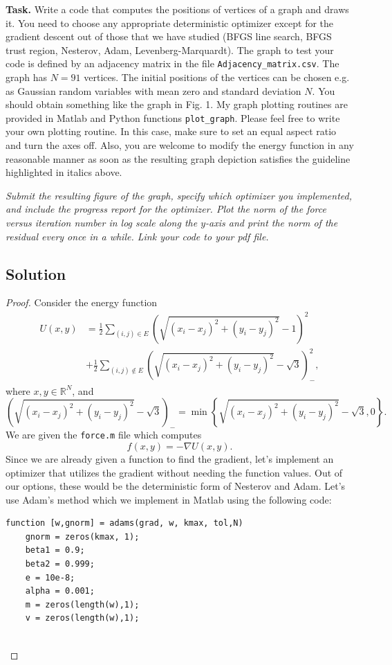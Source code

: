 \documentclass[12pt]{report}
\newenvironment{problem}{}{\newpage}
\begin{document}
\begin{problem}
\textbf{Task.} Write a code that computes the positions of vertices of a graph and draws it. You need to choose any appropriate deterministic optimizer except for the gradient descent out of those that we have studied (BFGS line search, BFGS trust region, Nesterov, Adam, Levenberg-Marquardt). The graph to test your code is defined by an adjacency matrix in the file \verb+Adjacency_matrix.csv+.  The graph has $N = 91$ vertices. The initial positions of the vertices can be chosen e.g. as Gaussian random variables with mean zero and standard deviation $N$. You should obtain something like the graph in Fig. 1. My graph plotting routines are provided in Matlab and Python functions \verb+plot_graph+. Please feel free to write your own plotting routine. In this case, make sure to set an equal aspect ratio and turn the axes off. Also, you are welcome to modify the energy function in any reasonable manner as soon as the resulting graph depiction satisfies the guideline highlighted in italics above.

\textit{Submit the resulting figure of the graph, specify which optimizer you implemented, and include the progress report for the optimizer. Plot the norm of the force versus iteration number in log scale along the $y$-axis and print the norm of the residual every once in a while. Link your code to your pdf file.}



\subsection*{Solution}
\begin{proof}
Consider the energy function 
\begin{align*}
    U(x,y) &= \frac{1}{2} \sum_{(i,j) \in E} \left( \sqrt{(x_i - x_j)^2 + (y_i - y_j)^2} - 1 \right)^2\\
    &+ \frac{1}{2} \sum_{(i,j) \notin E} \left( \sqrt{(x_i - x_j)^2 + (y_i - y_j)^2} - \sqrt{3} \right)^2_{-}, \nonumber
\end{align*}
where $x, y \in \mathbb{R}^N$, and
\begin{equation*}
    \left( \sqrt{(x_i - x_j)^2 + (y_i - y_j)^2} - \sqrt{3} \right)_{-} = \min \left\{ \sqrt{(x_i - x_j)^2 + (y_i - y_j)^2} - \sqrt{3}, 0 \right\}.
\end{equation*}
We are given the \verb+force.m+ file which computes
\begin{equation*}
    f(x,y) = - \nabla U(x,y).
\end{equation*}
Since we are already given a function to find the gradient, let's implement an optimizer that utilizes the gradient without needing the function values. Out of our options, these would be the deterministic form of Nesterov and Adam. Let's use Adam's method which we implement in Matlab using the following code: 
\begin{lstlisting}[style=Matlab-editor]
function [w,gnorm] = adams(grad, w, kmax, tol,N)
    gnorm = zeros(kmax, 1); 
    beta1 = 0.9;
    beta2 = 0.999; 
    e = 10e-8;
    alpha = 0.001;
    m = zeros(length(w),1);
    v = zeros(length(w),1);
    

\end{lstlisting}
\end{proof}
\end{problem}
\end{document}
